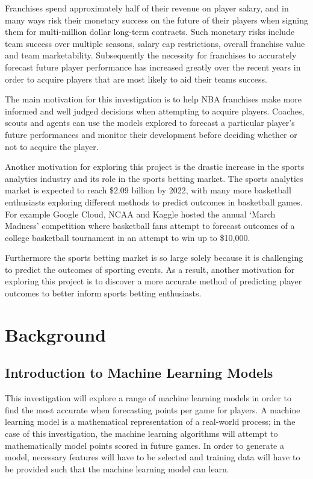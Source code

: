 \documentclass[a4paper,11pt,twoside]{article}
\begin{document}
Franchises spend approximately half of their revenue on player salary, and in many ways risk their monetary success on the future of their players when signing them for multi-million dollar long-term contracts. Such monetary risks include team success over multiple seasons, salary cap restrictions, overall franchise value and team marketability. Subsequently the necessity for franchises to accurately forecast future player performance has increased greatly over the recent years in order to acquire players that are most likely to aid their teams success.

The main motivation for this investigation is to help NBA franchises make more informed and well judged decisions when attempting to acquire players. Coaches, scouts and agents can use the models explored  to forecast a particular player's future performances and monitor their development before deciding whether or not to acquire the player. 

Another motivation for exploring this project is the drastic increase in the sports analytics industry and its role in the sports betting market. The sports analytics market is expected to reach \$2.09 billion by 2022, with many more basketball enthusiasts exploring different methods to predict outcomes in basketball games. For example Google Cloud, NCAA and Kaggle hosted the annual `March Madness' competition where basketball fans attempt to forecast outcomes of a college basketball tournament in an attempt to win up to \$10,000.

 Furthermore the sports betting market is so large solely because it is challenging to predict the outcomes of sporting events. As a result, another motivation for exploring this project is to discover a more accurate method of predicting player outcomes to better inform sports betting enthusiasts. 
 

\newpage

\section{Background}

\subsection{Introduction to Machine Learning Models}

This investigation will explore a range of machine learning models in order to find the most accurate when forecasting points per game for players. A machine learning model is a mathematical representation of a real-world process; in the case of this investigation, the machine learning algorithms will attempt to mathematically model points scored in future games. In order to generate a model, necessary features will have to be selected and training data will have to be provided such that the machine learning model can learn.
\end{document}
